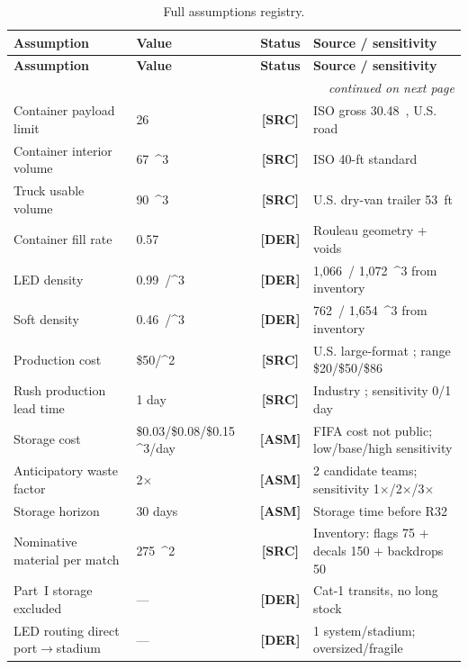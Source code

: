 \documentclass[11pt,a4paper]{article}
\numberwithin{equation}{section}
\newcommand{\USD}[1]{\$#1}
\newcommand{\mcube}{\text{m}^{3}}
\newcommand{\msq}{\text{m}^{2}}
\newcommand{\tonne}{\text{t}}
\newcommand{\statusSourced}{{\color{LimeFIFA!70!NavyFIFA}\bfseries\textsf{[SRC]}}}
\newcommand{\statusDerived}{{\color{BlueFIFA}\bfseries\textsf{[DER]}}}
\newcommand{\statusAssumed}{{\color{RedFIFA}\bfseries\textsf{[ASM]}}}
\begin{document}
\begin{longtable}{@{}p{}p{}c p{}@{}}
\caption{Full assumptions registry.\label{tab:assumptions}}\\
\toprule
\textbf{Assumption} & \textbf{Value} & \textbf{Status} & \textbf{Source / sensitivity}\\
\midrule
\endfirsthead
\toprule
\textbf{Assumption} & \textbf{Value} & \textbf{Status} & \textbf{Source / sensitivity}\\
\midrule
\endhead
\midrule
\multicolumn{4}{r}{\textit{continued on next page}}\\
\endfoot
\bottomrule
\endlastfoot
Container payload limit & 26~\tonne & \statusSourced{} & ISO gross 30.48~\tonne, U.S. road \cite{fmcsa_weight,iso_container} \\
Container interior volume & 67~\mcube & \statusSourced{} & ISO 40-ft standard \cite{iso_container} \\
Truck usable volume & 90~\mcube & \statusSourced{} & U.S. dry-van trailer 53~ft \\
Container fill rate & 0.57 & \statusDerived{} & Rouleau geometry + voids \cite{arcsupplies_rolls} \\
LED density & 0.99~\tonne/\mcube & \statusDerived{} & 1{,}066~\tonne / 1{,}072~\mcube{} from inventory \\
Soft density & 0.46~\tonne/\mcube & \statusDerived{} & 762~\tonne / 1{,}654~\mcube{} from inventory \\
Production cost & \USD{50}/\msq & \statusSourced{} & U.S. large-format \cite{costhack_printing}; range \$20/\$50/\$86 \\
Rush production lead time & 1 day & \statusSourced{} & Industry \cite{signsnyc_rush}; sensitivity 0/1 day \\
Storage cost & \USD{0.03}/\USD{0.08}/\USD{0.15} \mcube/day & \statusAssumed{} & FIFA cost not public; low/base/high sensitivity \\
Anticipatory waste factor & 2$\times$ & \statusAssumed{} & 2 candidate teams; sensitivity 1$\times$/2$\times$/3$\times$ \\
Storage horizon & 30 days & \statusAssumed{} & Storage time before R32 \\
Nominative material per match & 275~\msq & \statusSourced{} & Inventory: flags 75 + decals 150 + backdrops 50 \\
Part~I storage excluded & --- & \statusDerived{} & Cat-1 transits, no long stock \\
LED routing direct port$\to$stadium & --- & \statusDerived{} & 1 system/stadium; oversized/fragile \cite{jyvisions_led} \\

\end{longtable}
\end{document}
